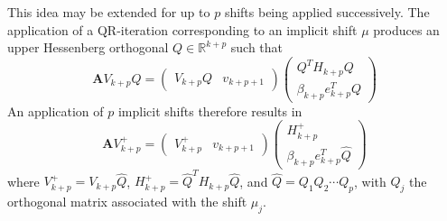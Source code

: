 \documentclass[12pt]{article}
\newcommand{\A}{\mathbf{A}}
\begin{document}
This idea may be extended for up to $p$ shifts being applied successively.  The application of a QR-iteration corresponding to an implicit shift $\mu$ produces an upper Hessenberg orthogonal  $Q \in \mathbb{R}^{k+p}$ such that
\begin{equation}
    \A V_{k+p}Q = \begin{pmatrix}V_{k+p}Q & v_{k+p+1}\end{pmatrix}\begin{pmatrix} Q^TH_{k+p}Q \\ \beta_{k+p}e_{k+p}^TQ \end{pmatrix}
    \label{}
\end{equation}
An application of $p$ implicit shifts therefore results in
\begin{equation}
    \A V_{k+p}^+ = \begin{pmatrix}V_{k+p}^+ & v_{k+p+1} \end{pmatrix}\begin{pmatrix}H_{k+p}^+ \\ \beta_{k+p}e_{k+p}^T\hat{Q} \end{pmatrix}
    \label{eq:pImplicitShifts}
\end{equation}
where $V_{k+p}^+ = V_{k+p}\hat{Q}$, $H_{k+p}^+ = \hat{Q}^TH_{k+p}\hat{Q}$, and $\hat{Q} = Q_1Q_2 \cdots Q_p$, with $Q_j$ the orthogonal matrix associated with the shift $\mu_j$.
\end{document}
